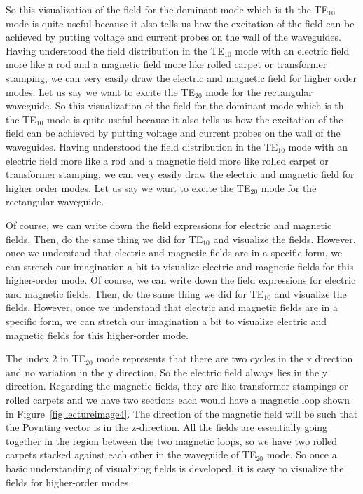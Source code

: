 So this visualization of the field for the dominant mode which is th the TE$_{10}$ mode is quite useful because it also tells us how the excitation of the field can be achieved by putting voltage and current probes on the wall of the waveguides. Having understood the field distribution in the  TE$_{10}$ mode with an electric field more like a rod and a magnetic field more like rolled carpet or transformer stamping, we can very easily draw the electric and magnetic field for higher order modes. Let us say we want to excite the TE$_{20}$ mode for the rectangular waveguide.
So this visualization of the field for the dominant mode which is th the TE$_{10}$ mode is quite useful because it also tells us how the excitation of the field can be achieved by putting voltage and current probes on the wall of the waveguides. Having understood the field distribution in the  TE$_{10}$ mode with an electric field more like a rod and a magnetic field more like rolled carpet or transformer stamping, we can very easily draw the electric and magnetic field for higher order modes. Let us say we want to excite the TE$_{20}$ mode for the rectangular waveguide.

Of course, we can write down the field expressions for electric and magnetic fields. Then, do the same thing we did for TE$_{10}$ and visualize the fields. However, once we understand that electric and magnetic fields are in a specific form, we can stretch our imagination a bit to visualize electric and magnetic fields for this higher-order mode.
Of course, we can write down the field expressions for electric and magnetic fields. Then, do the same thing we did for TE$_{10}$ and visualize the fields. However, once we understand that electric and magnetic fields are in a specific form, we can stretch our imagination a bit to visualize electric and magnetic fields for this higher-order mode.

The index 2 in TE$_{20}$ mode represents that there are two cycles in the x direction and no variation in the y direction. So the electric field always lies in the y direction. Regarding the magnetic fields, they are like transformer stampings or rolled carpets and we have two sections each would have a magnetic loop shown in Figure~\ref{fig:lectureimage4}. The direction of the magnetic field will be such that the Poynting vector is in the z-direction. All the fields are essentially going together in the region between the two magnetic loops, so we have two rolled carpets stacked against each other in the waveguide of TE$_{20}$ mode. So once a basic understanding of visualizing fields is developed, it is easy to visualize the fields for higher-order modes.

